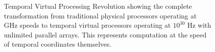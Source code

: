 \documentclass[12pt,a4paper]{article}
\begin{document}
\begin{figure}[h]
\caption{Temporal Virtual Processing Revolution showing the complete transformation from traditional physical processors operating at GHz speeds to temporal virtual processors operating at $10^{30}$ Hz with unlimited parallel arrays. This represents computation at the speed of temporal coordinates themselves.}
\label{fig:temporal_virtual_processing_revolution}
\end{figure}
\end{document}
